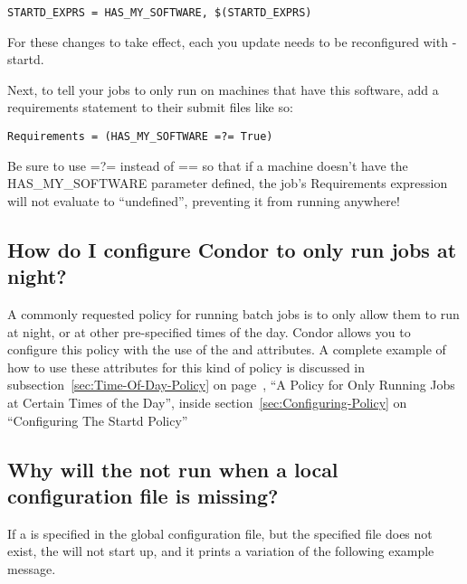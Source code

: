 \begin{verbatim}STARTD_EXPRS = HAS_MY_SOFTWARE, $(STARTD_EXPRS)\end{verbatim}

\Note For these changes to take effect, each  you update
needs to be reconfigured with  -startd.

Next, to tell your jobs to only run on machines that have this
software, add a requirements statement to their submit files like so:

\begin{verbatim}Requirements = (HAS_MY_SOFTWARE =?= True)\end{verbatim}

\Note Be sure to use =?= instead of == so that if a machine doesn't have
the HAS\_MY\_SOFTWARE parameter defined, the job's Requirements
expression will not evaluate to ``undefined'', preventing it from
running anywhere!


\subsection{How do I configure Condor to only run jobs at night?}

A commonly requested policy for running batch jobs is to only allow
them to run at night, or at other pre-specified times of the day.
Condor allows you to configure this policy with the use of the
 and   attributes.  
A complete example of how to use these attributes for this kind of
policy is discussed in subsection~\ref{sec:Time-Of-Day-Policy} on
page~\pageref{sec:Time-Of-Day-Policy}, ``A Policy for Only Running
Jobs at Certain Times of the Day'', inside
section~\ref{sec:Configuring-Policy} on ``Configuring The Startd
Policy''


\subsection{Why will the  not run when a local
configuration file is missing?}

If a  
is specified in the global configuration file,
but the specified file does not exist,
the  will not start up, and it prints a variation
of the following example message.

